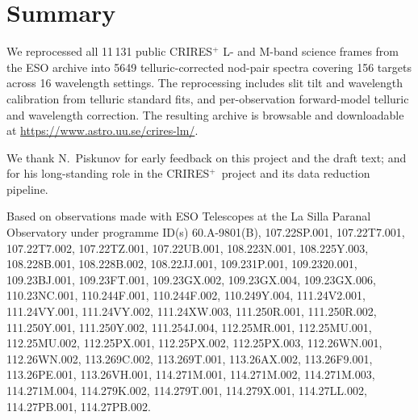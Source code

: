 \documentclass{aa}
\newcommand{\crires}{CRIRES$^+$}
\begin{document}
\section{Summary}
\label{sec:summary}

We reprocessed all 11\,131 public \crires{} L- and M-band science
frames from the ESO archive into 5649 telluric-corrected nod-pair spectra
covering 156 targets across 16 wavelength settings. The reprocessing
includes slit tilt and wavelength calibration from telluric standard fits,
and per-observation forward-model telluric and wavelength correction.
The resulting archive is browsable and downloadable at
\url{https://www.astro.uu.se/crires-lm/}.


\begin{acknowledgements}
We thank N.~Piskunov for early feedback on this project and the draft text; and for
his long-standing role in the \crires\ project and its data reduction pipeline.

Based on observations made with ESO Telescopes at the La Silla Paranal Observatory under programme ID(s)
60.A-9801(B),
107.22SP.001,
107.22T7.001,
107.22T7.002,
107.22TZ.001,
107.22UB.001,
108.223N.001,
108.225Y.003,
108.228B.001,
108.228B.002,
108.22JJ.001,
109.231P.001,
109.2320.001,
109.23BJ.001,
109.23FT.001,
109.23GX.002,
109.23GX.004,
109.23GX.006,
110.23NC.001,
110.244F.001,
110.244F.002,
110.249Y.004,
111.24V2.001,
111.24VY.001,
111.24VY.002,
111.24XW.003,
111.250R.001,
111.250R.002,
111.250Y.001,
111.250Y.002,
111.254J.004,
112.25MR.001,
112.25MU.001,
112.25MU.002,
112.25PX.001,
112.25PX.002,
112.25PX.003,
112.26WN.001,
112.26WN.002,
113.269C.002,
113.269T.001,
113.26AX.002,
113.26F9.001,
113.26PE.001,
113.26VH.001,
114.271M.001,
114.271M.002,
114.271M.003,
114.271M.004,
114.279K.002,
114.279T.001,
114.279X.001,
114.27LL.002,
114.27PB.001,
114.27PB.002.
\end{acknowledgements}




\end{document}
